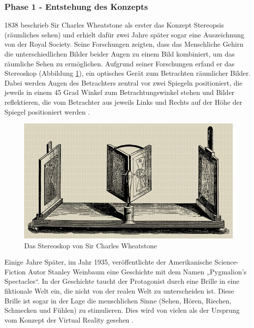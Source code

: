 \subsubsection{Phase 1 - Entstehung des Konzepts}
1838 beschrieb Sir Charles Wheatstone als erster das Konzept Stereopsis (räumliches sehen) und erhielt dafür zwei Jahre später sogar eine Auszeichnung von der Royal Society. Seine Forschungen zeigten, dass das Menschliche Gehirn die unterschiedlichen Bilder beider Augen zu einem Bild kombiniert, um das räumliche Sehen zu ermöglichen. Aufgrund seiner Forschungen erfand er das Stereoskop (Abbildung \ref{fig:Stereoskop}), ein optisches Gerät zum Betrachten räumlicher Bilder. Dabei werden Augen des Betrachters zentral vor zwei Spiegeln positioniert, die jeweils in einem 45 Grad Winkel zum Betrachtungswinkel stehen und Bilder reflektieren, die vom Betrachter aus jeweils Links und Rechts auf der Höhe der Spiegel positioniert werden \cite{20}.
\begin{figure}[h]
	\centering
	\includegraphics[width=0.5\linewidth]{Bilder/A13_Stereoskop}
	\caption{Das Stereoskop von Sir Charles Wheatstone \cite{20}}
	\label{fig:Stereoskop}
\end{figure}
\newline
\noindent
Einige Jahre Später, im Jahr 1935, veröffentlichte der Amerikanische Science-Fiction Autor Stanley Weinbaum eine Geschichte mit dem Namen „Pygmalion’s Spectacles“. In der Geschichte taucht der Protagonist durch eine Brille in eine fiktionale Welt ein, die nicht von der realen Welt zu unterscheiden ist. Diese Brille ist sogar in der Lage die menschlichen Sinne (Sehen, Hören, Riechen, Schmecken und Fühlen) zu stimulieren. Dies wird von vielen als der Ursprung vom Konzept der Virtual Reality gesehen \cite{20}.

